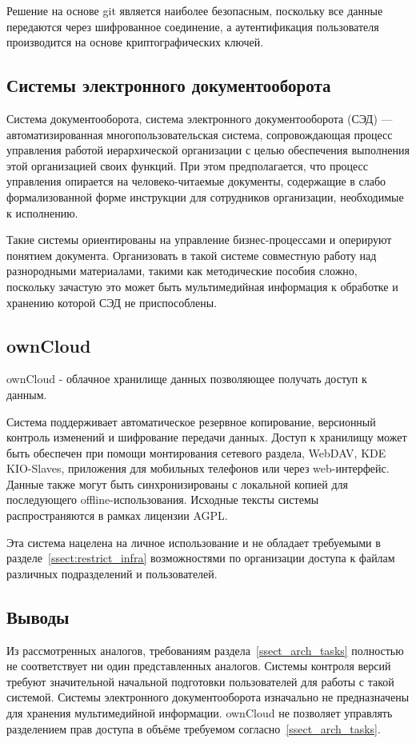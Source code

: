 \documentclass[utf8,usehyperref,12pt]{G7-32}
\begin{document}
Решение на основе git является наиболее безопасным, поскольку все данные передаются через шифрованное соединение, а аутентификация пользователя производится на основе криптографических ключей.

\subsection{Системы электронного документооборота}
Система документооборота, система электронного документооборота (СЭД) — автоматизированная многопользовательская система, сопровождающая процесс управления работой иерархической организации с целью обеспечения выполнения этой организацией своих функций. При этом предполагается, что процесс управления опирается на человеко-читаемые документы, содержащие в слабо формализованной форме инструкции для сотрудников организации, необходимые к исполнению.

Такие системы ориентированы на управление бизнес-процессами и оперируют понятием документа. Организовать в такой системе совместную работу над разнородными материалами, такими как методические пособия сложно, поскольку зачастую это может быть мультимедийная информация к обработке и хранению которой СЭД не приспособлены.

\subsection{ownCloud}
ownCloud - облачное хранилище данных позволяющее получать доступ к данным.

Система поддерживает автоматическое резервное копирование, версионный контроль изменений и шифрование передачи данных. Доступ к хранилищу может быть обеспечен при помощи монтирования сетевого раздела, WebDAV, KDE KIO-Slaves, приложения для мобильных телефонов или через web-интерфейс. Данные также могут быть синхронизированы с локальной копией для последующего offline-использования. Исходные тексты системы распространяются в рамках лицензии AGPL.

Эта система нацелена на личное использование и не обладает требуемыми в разделе~\ref{ssect:restrict_infra} возможностями по организации доступа к файлам различных подразделений и пользователей.

\subsection{Выводы}

Из рассмотренных аналогов, требованиям раздела~\ref{ssect_arch_tasks} полностью не соответствует ни один представленных аналогов. Системы контроля версий требуют значительной начальной подготовки пользователей для работы с такой системой. Системы электронного документооборота изначально не предназначены для хранения мультимедийной информации. ownCloud не позволяет управлять разделением прав доступа в объёме требуемом согласно~\ref{ssect_arch_tasks}.
\end{document}
